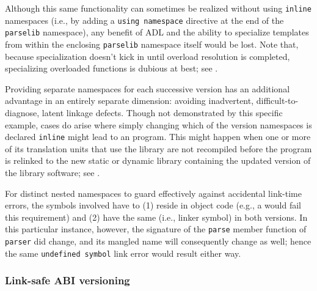 Although this same functionality can sometimes be realized without using \lstinline!inline! namespaces (i.e., by adding a
\lstinline!using!~\lstinline!namespace! directive at the end of the
\lstinline!parselib! namespace), any benefit of ADL and the ability to
specialize templates from within the enclosing \lstinline!parselib!
namespace itself would be lost. Note that, because
specialization doesn't kick in until overload resolution is completed,
specializing overloaded functions is dubious at best; see .

Providing separate namespaces for each successive version has an
additional advantage in an entirely separate dimension: avoiding inadvertent, difficult-to-diagnose, latent linkage defects. Though not
demonstrated by this specific example,
cases do arise where simply changing which of the version namespaces is
declared \lstinline!inline! might lead to an  program. This might happen when one or more of
its translation units that use the library are not recompiled before the
program is relinked to the new static or dynamic library containing the
updated version of the library software; see .

For distinct
nested namespaces to guard effectively against accidental link-time
errors, the symbols involved have to (1) reside in object code (e.g.,
a  would fail this requirement) and (2)
have the same  (i.e., linker symbol) in both
versions. In this particular instance, however, the signature of the
\lstinline!parse! member function of \lstinline!parser! did change, and its
mangled name will consequently change as well; hence the same
  \lstinline!undefined!~\lstinline!symbol! link error would result either way.

\subsubsection[Link-safe ABI versioning]{Link-safe ABI versioning}\label{link-safe-abi-versioning}

